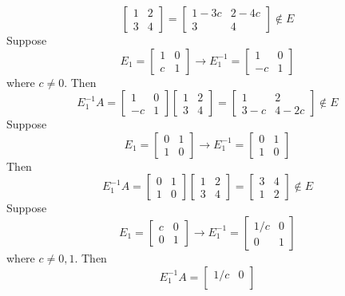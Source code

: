 \documentclass[12pt]{article}
\begin{document}
\begin{itemize}
$$\begin{bmatrix}
1 & 2 \\
3 & 4
\end{bmatrix} = \begin{bmatrix}
1 - 3c & 2 - 4c \\
3 & 4
\end{bmatrix} \not \in E$$
Suppose
$$E_1 = \begin{bmatrix}
1 & 0 \\
c & 1
\end{bmatrix} \rightarrow E_1^{-1} = \begin{bmatrix}
1 & 0 \\
-c & 1
\end{bmatrix}$$
where $c \neq 0$. Then
$$E_1^{-1}A = \begin{bmatrix}
1 & 0 \\
-c & 1
\end{bmatrix}\begin{bmatrix}
1 & 2 \\
3 & 4
\end{bmatrix} = \begin{bmatrix}
1 & 2 \\
3 - c & 4 - 2c
\end{bmatrix} \not \in E$$
Suppose
$$E_1 = \begin{bmatrix}
0 & 1 \\
1 & 0
\end{bmatrix} \rightarrow E_1^{-1} = \begin{bmatrix}
0 & 1 \\
1 & 0
\end{bmatrix}$$
Then
$$E_1^{-1}A = \begin{bmatrix}
0 & 1 \\
1 & 0
\end{bmatrix}\begin{bmatrix}
1 & 2 \\
3 & 4
\end{bmatrix} = \begin{bmatrix}
3 & 4 \\
1 & 2
\end{bmatrix} \not \in E$$
Suppose
$$E_1 = \begin{bmatrix}
c & 0 \\
0 & 1
\end{bmatrix} \rightarrow E_1^{-1} = \begin{bmatrix}
1/c & 0 \\
0 & 1
\end{bmatrix}$$
where $c \neq 0, 1$. Then
$$E_1^{-1}A = \begin{bmatrix}
1/c & 0 \\

\end{bmatrix}$$
\end{itemize}
\end{document}
